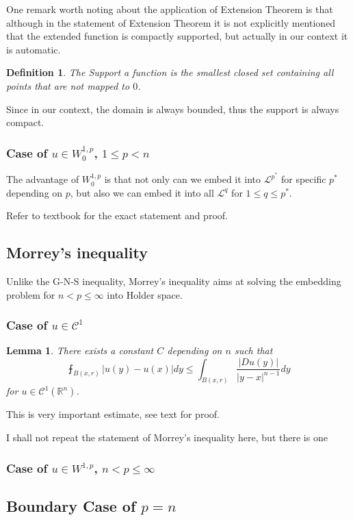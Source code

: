 \documentclass{article}
\begin{document}
One remark worth noting about the application of Extension Theorem is that although in the statement of Extension Theorem it is not explicitly mentioned that the extended function is compactly supported, but actually in our context it is automatic. 

\newtheorem{Def}{Definition}[section]
\begin{Def}
    The Support a function is the smallest closed set containing all points that are not mapped to $0$.
\end{Def}

Since in our context, the domain is always bounded, thus the support is always compact.

\subsubsection{Case of $u\in W^{1,p}_{0}$, $1\leq p< n$}

The advantage of $W^{1,p}_0$ is that not only can we embed it into $\mathscr{L}^{p^*}$ for specific $p^*$ depending on $p$, but also we can embed it into all $\mathscr{L}^{q}$ for $1\leq q\leq p^*$.

Refer to textbook for the exact statement and proof.

\subsection{Morrey's inequality}

Unlike the G-N-S inequality, Morrey's inequality aims at solving the embedding problem for $n<p\leq \infty$ into Holder space.

\subsubsection{Case of $u\in \mathscr{C}^{1}$}

\newtheorem{Lem}{Lemma}
\begin{Lem}
    There exists a constant $C$ depending on $n$ such that 
    $$
    \intbar_{B(x,r)}|u(y)-u(x)|dy\leq\int_{B(x,r)}\frac{|Du(y)|}{|y-x|^{n-1}}dy
    $$
    for $u\in\mathscr{C}^1(\mathbb{R}^n)$.
\end{Lem} 

This is very important estimate, see text for proof.

I shall not repeat the statement of Morrey's inequality here, but there is one 
\subsubsection{Case of $u\in W^{1, p}$, $n< p\leq \infty$}

\subsection{Boundary Case of $p=n$}
\end{document}
